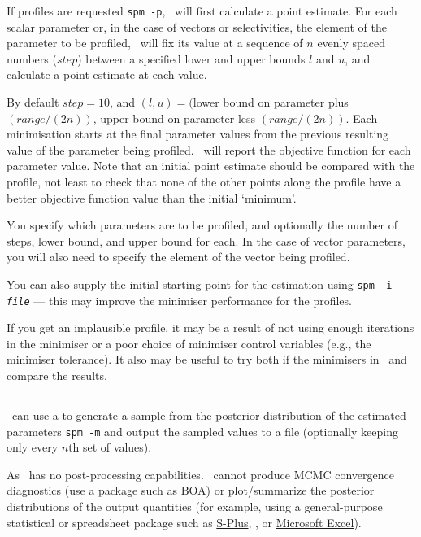 If profiles are requested \texttt{spm -p}, \SPM\ will first calculate a point estimate. For each scalar parameter or, in the case of vectors or selectivities, the element of the parameter to be profiled, \SPM\ will fix its value at a sequence of $n$ evenly spaced numbers ($step$) between a specified lower and upper bounds $l$ and $u$, and calculate a point estimate at each value. 

By default $step=10$, and $(l, u)=($lower bound on parameter plus $(range/(2n))$, upper bound on parameter less $(range/(2n))$. Each minimisation starts at the final parameter values from the previous resulting value of the parameter being profiled. \SPM\ will report the objective function for each parameter value. Note that an initial point estimate should be compared with the profile, not least to check that none of the other points along the profile have a better objective function value than the initial `minimum'.

You specify which parameters are to be profiled, and optionally the number of steps, lower bound, and upper bound for each. In the case of vector parameters, you will also need to specify the element of the vector being profiled. 

You can also supply the initial starting point for the estimation using \texttt{spm -i \emph{file}} --- this may improve the minimiser performance for the profiles.

If you get an implausible profile, it may be a result of not using enough iterations in the minimiser or a poor choice of minimiser control variables (e.g., the minimiser tolerance). It also may be useful to try both if the minimisers in \SPM\ and compare the results.

\subsection{\label{sec:estimate-MCMC}}

\SPM\ can use a  to generate a sample from the posterior distribution of the estimated parameters \texttt{spm -m} and output the sampled values to a file (optionally keeping only every $n$th set of values).

As \SPM\ has no post-processing capabilities. \SPM\ cannot produce MCMC convergence diagnostics (use a package such as \href{http://www.public-health.uiowa.edu/boa}{BOA}) or plot/summarize the posterior distributions of the output quantities (for example, using a general-purpose statistical or spreadsheet package such as \href{http://www.insightful.com}{S-Plus}, \href{http://www.r-project.org}{\R}, or \href{http://www.microsoft.com}{Microsoft Excel}).

